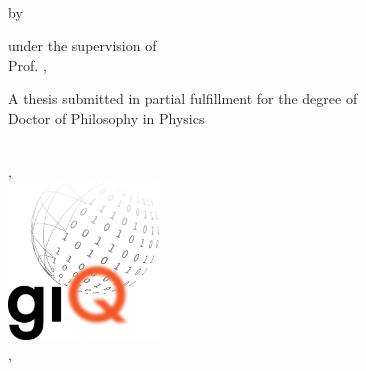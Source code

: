 
\begin{titlepage}
\begin{center}
    \vspace*{1cm}
    \myUniversity\\
    \vspace{1cm}
    {\Large \color{myColor}{\textbf{\myTitle}}}

    \vspace{0.25cm}

    {\large \color{myColor}{\mySubtitle}}

    \vspace{.5cm}
    by\\
    \textsc{\myName}
	\vspace{1 cm}

	under the supervision of \vspace{0.25cm}\\

	Prof. \textsc{\myProfessor,} \\

	\vspace{1 cm}

	A thesis submitted in partial fulfillment for the degree of \\
	Doctor of Philosophy in Physics
	\vspace{0.5cm}

    \myGroup \\
    \myDepartment, \myFaculty\\
    	\vspace{0.5cm}
    \includegraphics[width=4cm]{Figures/giqlogo2.png}\\
    	\vspace{0.5cm}
	\myLocation, \myTime
\end{center}
\end{titlepage}
